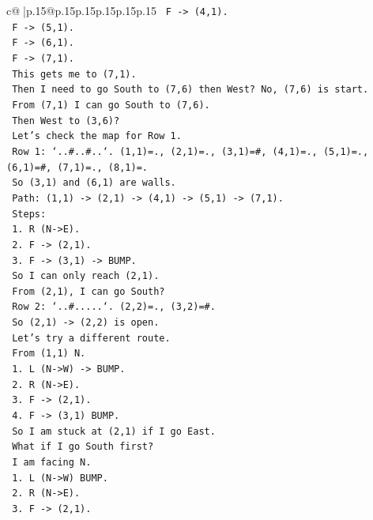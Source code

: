 \documentclass{article}
\begin{document}
{\begin{supertabular}{c@{$\;$}|p{.15\linewidth}@{}p{.15\linewidth}p{.15\linewidth}p{.15\linewidth}p{.15\linewidth}p{.15\linewidth}}
{{{\texttt{   F {-}> (4,1).} \\
\texttt{   F {-}> (5,1).} \\
\texttt{   F {-}> (6,1).} \\
\texttt{   F {-}> (7,1).} \\
\texttt{   This gets me to (7,1).} \\
\texttt{   Then I need to go South to (7,6) then West? No, (7,6) is start.} \\
\texttt{   From (7,1) I can go South to (7,6).} \\
\texttt{   Then West to (3,6)?} \\
\texttt{   Let's check the map for Row 1.} \\
\texttt{   Row 1: `..\#..\#..`. (1,1)=., (2,1)=., (3,1)=\#, (4,1)=., (5,1)=., (6,1)=\#, (7,1)=., (8,1)=.} \\
\texttt{   So (3,1) and (6,1) are walls.} \\
\texttt{   Path: (1,1) {-}> (2,1) {-}> (4,1) {-}> (5,1) {-}> (7,1).} \\
\texttt{   Steps:} \\
\texttt{   1. R (N{-}>E).} \\
\texttt{   2. F {-}> (2,1).} \\
\texttt{   3. F {-}> (3,1) {-}> BUMP.} \\
\texttt{   So I can only reach (2,1).} \\
\texttt{   From (2,1), I can go South?} \\
\texttt{   Row 2: `..\#.....`. (2,2)=., (3,2)=\#.} \\
\texttt{   So (2,1) {-}> (2,2) is open.} \\
\texttt{   Let's try a different route.} \\
\texttt{   From (1,1) N.} \\
\texttt{   1. L (N{-}>W) {-}> BUMP.} \\
\texttt{   2. R (N{-}>E).} \\
\texttt{   3. F {-}> (2,1).} \\
\texttt{   4. F {-}> (3,1) BUMP.} \\
\texttt{   So I am stuck at (2,1) if I go East.} \\
\texttt{   What if I go South first?} \\
\texttt{   I am facing N.} \\
\texttt{   1. L (N{-}>W) BUMP.} \\
\texttt{   2. R (N{-}>E).} \\
\texttt{   3. F {-}> (2,1).} \\
}}}
\end{supertabular}}
\end{document}
